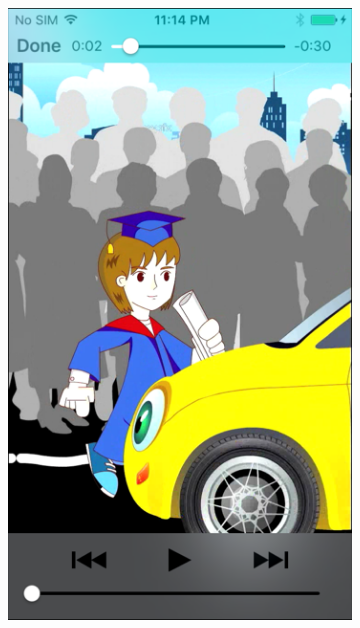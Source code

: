 \begin{figure}[H]\centering
    \begin{subfigure}{0.25\textwidth}
\includegraphics[width=\textwidth]{video1}
\caption{}
    \end{subfigure}\hspace{0.03\textwidth}
 \begin{subfigure}{0.25\textwidth}

\end{subfigure}
\end{figure}
